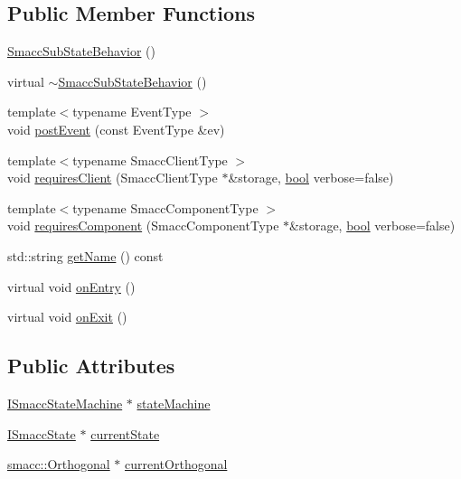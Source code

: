 \subsection*{Public Member Functions}
\begin{DoxyCompactItemize}
\item 
\hyperlink{classsmacc_1_1SmaccSubStateBehavior_abc902f4fa003071f759a2255b276fb90}{Smacc\+Sub\+State\+Behavior} ()
\item 
virtual \hyperlink{classsmacc_1_1SmaccSubStateBehavior_a69c91bee534322bc09423d6f5b0c33a2}{$\sim$\+Smacc\+Sub\+State\+Behavior} ()
\item 
{\footnotesize template$<$typename Event\+Type $>$ }\\void \hyperlink{classsmacc_1_1SmaccSubStateBehavior_a8538664f9828247727a27446112788a2}{post\+Event} (const Event\+Type \&ev)
\item 
{\footnotesize template$<$typename Smacc\+Client\+Type $>$ }\\void \hyperlink{classsmacc_1_1SmaccSubStateBehavior_ae8361a9e794b02f9f3d962b881e4fd7d}{requires\+Client} (Smacc\+Client\+Type $\ast$\&storage, \hyperlink{classbool}{bool} verbose=false)
\item 
{\footnotesize template$<$typename Smacc\+Component\+Type $>$ }\\void \hyperlink{classsmacc_1_1SmaccSubStateBehavior_a9f31f62f886cc06017e92fa0d834b12d}{requires\+Component} (Smacc\+Component\+Type $\ast$\&storage, \hyperlink{classbool}{bool} verbose=false)
\item 
std\+::string \hyperlink{classsmacc_1_1SmaccSubStateBehavior_a077a9784d17e3a95284ad351a43cfcbb}{get\+Name} () const 
\item 
virtual void \hyperlink{classsmacc_1_1SmaccSubStateBehavior_a7c28e1c46238bbb2c2e0450573c6de94}{on\+Entry} ()
\item 
virtual void \hyperlink{classsmacc_1_1SmaccSubStateBehavior_a1f87ab55c1805b2a2fd9c022807d35b9}{on\+Exit} ()
\end{DoxyCompactItemize}
\subsection*{Public Attributes}
\begin{DoxyCompactItemize}
\item 
\hyperlink{classsmacc_1_1ISmaccStateMachine}{I\+Smacc\+State\+Machine} $\ast$ \hyperlink{classsmacc_1_1SmaccSubStateBehavior_ae3ff8a316bdd4bc5b7fee59d19464609}{state\+Machine}
\item 
\hyperlink{classsmacc_1_1ISmaccState}{I\+Smacc\+State} $\ast$ \hyperlink{classsmacc_1_1SmaccSubStateBehavior_a62e2b9da4a446f09396d0b4c01659b88}{current\+State}
\item 
\hyperlink{classsmacc_1_1Orthogonal}{smacc\+::\+Orthogonal} $\ast$ \hyperlink{classsmacc_1_1SmaccSubStateBehavior_a40aac919bb306d95838fdfcc34cfe391}{current\+Orthogonal}
\end{DoxyCompactItemize}


